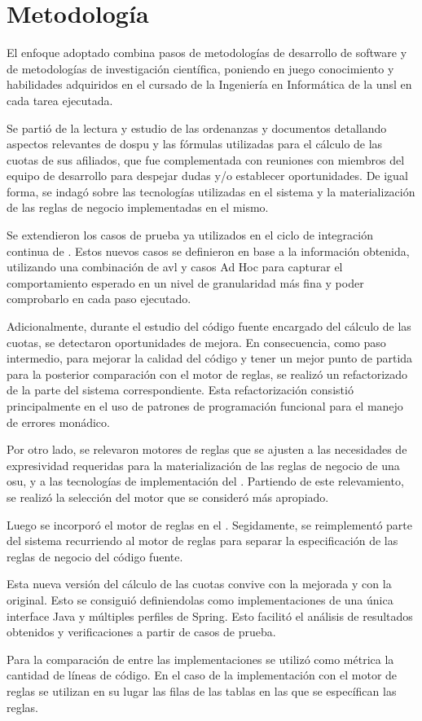\section{Metodología} \label{sec:metodologia}

El enfoque adoptado combina pasos de metodologías de desarrollo de software y de metodologías de investigación científica, poniendo en juego conocimiento y habilidades adquiridos en el cursado de la Ingeniería en Informática de la \acrshort{unsl} en cada tarea ejecutada.

Se partió de la lectura y estudio de las ordenanzas y documentos detallando aspectos relevantes de \acrshort{dospu} y las fórmulas utilizadas para el cálculo de las cuotas de sus afiliados, que fue complementada con reuniones con miembros del equipo de desarrollo {\SIDOSPU} para despejar dudas y/o establecer oportunidades. 
De igual forma, se indagó sobre las tecnologías utilizadas en el sistema y la materialización de las reglas de negocio implementadas en el mismo.

Se extendieron los casos de prueba ya utilizados en el ciclo de integración continua de {\SIDOSPU}.
Estos nuevos casos se definieron en base a la información obtenida, utilizando una combinación de \acrfull{avl} y casos Ad Hoc para capturar el comportamiento esperado en un nivel de granularidad más fina y poder comprobarlo en cada paso ejecutado.

Adicionalmente, durante el estudio del código fuente encargado del cálculo de las cuotas, se detectaron oportunidades de mejora. 
En consecuencia, como paso intermedio, para mejorar la calidad del código y tener un mejor punto de partida para la posterior comparación con el motor de reglas, se realizó un refactorizado de la parte del sistema correspondiente. 
Esta refactorización consistió principalmente en el uso de patrones de programación funcional para el manejo de errores monádico.

Por otro lado, se relevaron motores de reglas que se ajusten a las necesidades de expresividad requeridas para la materialización de las reglas de negocio de una \acrshort{osu}, y a las tecnologías de implementación del {\SIDOSPU}. 
Partiendo de este relevamiento, se realizó la selección del motor que se consideró más apropiado.

Luego se incorporó el motor de reglas en el {\SIDOSPU}. 
Segidamente, se reimplementó parte del sistema recurriendo al motor de reglas para separar la especificación de las reglas de negocio del código fuente.

Esta nueva versión del cálculo de las cuotas convive con la mejorada y con la original. 
Esto se consiguió definiendolas como implementaciones de una única interface Java y múltiples perfiles de Spring. 
Esto facilitó el análisis de resultados obtenidos y verificaciones a partir de casos de prueba. 

Para la comparación de entre las implementaciones se utilizó como métrica la cantidad de líneas de código.  
En el caso de la implementación con el motor de reglas se utilizan en su lugar las filas de las tablas en las que se específican las reglas.
